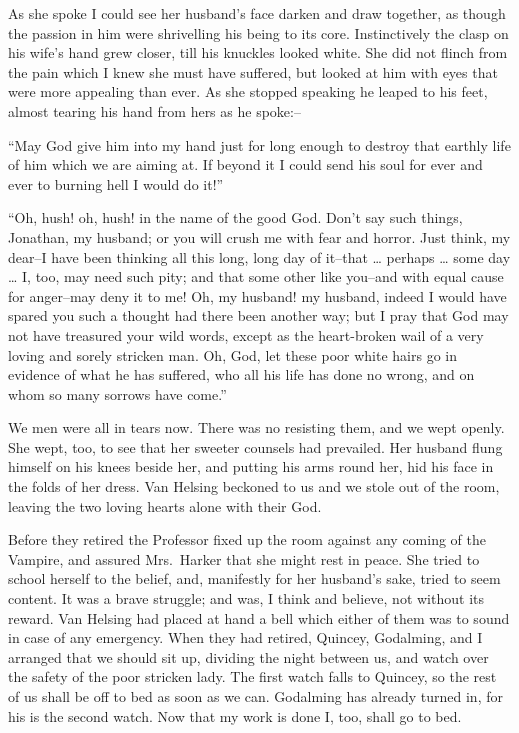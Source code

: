 \documentclass[12pt,openright]{book}
\begin{document}
As she spoke I could see her husband’s face darken and draw together, as though the passion in him were shrivelling his being to its core. Instinctively the clasp on his wife’s hand grew closer, till his knuckles looked white. She did not flinch from the pain which I knew she must have suffered, but looked at him with eyes that were more appealing than ever. As she stopped speaking he leaped to his feet, almost tearing his hand from hers as he spoke:–

“May God give him into my hand just for long enough to destroy that earthly life of him which we are aiming at. If beyond it I could send his soul for ever and ever to burning hell I would do it!”

“Oh, hush! oh, hush! in the name of the good God. Don’t say such things, Jonathan, my husband; or you will crush me with fear and horror. Just think, my dear–I have been thinking all this long, long day of it–that … perhaps … some day … I, too, may need such pity; and that some other like you–and with equal cause for anger–may deny it to me! Oh, my husband! my husband, indeed I would have spared you such a thought had there been another way; but I pray that God may not have treasured your wild words, except as the heart-broken wail of a very loving and sorely stricken man. Oh, God, let these poor white hairs go in evidence of what he has suffered, who all his life has done no wrong, and on whom so many sorrows have come.”

We men were all in tears now. There was no resisting them, and we wept openly. She wept, too, to see that her sweeter counsels had prevailed. Her husband flung himself on his knees beside her, and putting his arms round her, hid his face in the folds of her dress. Van Helsing beckoned to us and we stole out of the room, leaving the two loving hearts alone with their God.

Before they retired the Professor fixed up the room against any coming of the Vampire, and assured Mrs. Harker that she might rest in peace. She tried to school herself to the belief, and, manifestly for her husband’s sake, tried to seem content. It was a brave struggle; and was, I think and believe, not without its reward. Van Helsing had placed at hand a bell which either of them was to sound in case of any emergency. When they had retired, Quincey, Godalming, and I arranged that we should sit up, dividing the night between us, and watch over the safety of the poor stricken lady. The first watch falls to Quincey, so the rest of us shall be off to bed as soon as we can. Godalming has already turned in, for his is the second watch. Now that my work is done I, too, shall go to bed.
\end{document}
